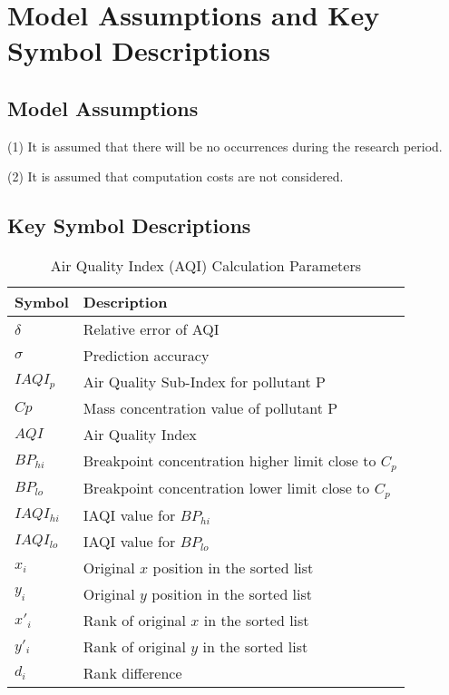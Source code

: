 \documentclass[12pt]{article}
\begin{document}
\section{Model Assumptions and Key Symbol Descriptions}

\subsection{Model Assumptions}

(1) It is assumed that there will be no occurrences during the research period.

(2) It is assumed that computation costs are not considered.

\subsection{Key Symbol Descriptions}

\begin{table}[h!]
	\centering
	\begin{tabular}{ll}
		\hline
		Symbol & Description \\
		\hline
		$\delta$ & Relative error of AQI \\
		$\sigma$ & Prediction accuracy \\
		$IAQI_p$ & Air Quality Sub-Index for pollutant P \\
		$Cp$ & Mass concentration value of pollutant P \\
		$AQI$ & Air Quality Index \\
		$BP_{hi}$ & Breakpoint concentration higher limit close to $C_p$ \\
		$BP_{lo}$ & Breakpoint concentration lower limit close to $C_p$ \\
		$IAQI_{hi}$ & IAQI value for $BP_{hi}$ \\
		$IAQI_{lo}$ & IAQI value for $BP_{lo}$ \\
		$x_i$ & Original $x$ position in the sorted list \\
		$y_i$ & Original $y$ position in the sorted list \\
		$x'_i$ & Rank of original $x$ in the sorted list \\
		$y'_i$ & Rank of original $y$ in the sorted list \\
		$d_i$ & Rank difference \\
		\hline
	\end{tabular}
	\caption{Air Quality Index (AQI) Calculation Parameters}
	\label{tab1}
\end{table}
\end{document}
